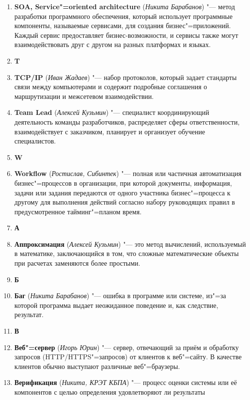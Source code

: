 \documentclass[a4paper, 14 pt]{extarticle}
\begin{document}
\begin{enumerate}
    \item \textbf{SOA, Service"=oriented architecture} 
    (\textit{Никита Барабанов}) "---  метод разработки программного обеспечения,
    который использует программные компоненты, называемые сервисами, для 
    создания бизнес"=приложений. Каждый сервис предоставляет бизнес-возможности,
    и сервисы также могут взаимодействовать друг с другом на разных платформах и
    языках.
    \item[] \textbf{T}
    \item \textbf{TCP/IP} (\textit{Иван Жадаев}) "--- набор протоколов, который 
    задает стандарты связи между компьютерами и содержит подробные соглашения о 
    маршрутизации и межсетевом взаимодействии.
    \item \textbf{Team Lead} (\textit{Алексей Кузьмин}) "--- специалист 
    координирующий деятельность команды разработчиков, распределяет сферы 
    ответственности, взаимодействует с заказчиком, планирует и организует 
    обучение специалистов.
    \item[] \textbf{W}
    \item \textbf{Workflow} (\textit{Ростислав, Сибинтек}) "--- полная или 
    частичная автоматизация бизнес"=процессов в организации, при которой 
    документы, информация, задачи или задания передаются от одного участника 
    бизнес"=процесса к другому для выполнения действий согласно набору 
    руководящих правил в предусмотренное тайминг"=планом время. 
    \item[] \textbf{А}
    \item \textbf{Аппроксимация} (\textit{Алексей Кузьмин}) "--- это метод 
    вычислений, используемый в математике, заключающийся в том, что сложные 
    математические объекты при расчетах заменяются более простыми. 
    \item[] \textbf{Б} 
    \item \textbf{Баг} (\textit{Никита Барабанов}) "--- ошибка в программе или 
    системе, из"=за которой программа выдает неожиданное поведение и, как 
    следствие, результат.   
    \item[] \textbf{В} 
    \item \textbf{Веб"=сервер} (\textit{Игорь Юрин}) "--- сервер, отвечающий за 
    приём и обработку запросов (HTTP/HTTPS"=запросов) от клиентов к веб"=сайту. 
    В качестве клиентов обычно выступают различные веб"=браузеры.
    \item \textbf{Верификация} (\textit{Никита, КРЭТ КБПА}) "--- процесс оценки 
    системы или её компонентов с целью определения удовлетворяют ли результаты 

\end{enumerate}
\end{document}
